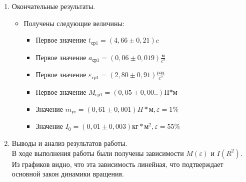 \documentclass[12pt]{article}
\begin{document}
\begin{enumerate}[label=\arabic*)]
        \item Окончательные результаты.
        \begin{itemize} 
            \item Получены следующие величины:
            \begin{itemize}
                \item Первое значение $t_{\text{ср1}} = (4,66 \pm 0,21) c$
                \item Первое значение $a_{\text{ср1}} = (0,06 \pm 0,019) \frac{\text{м}}{c^2}$
                \item Первое значение $\varepsilon_{\text{ср1}} = (2,80 \pm 0,91) \frac{\text{рад}}{c^2}$
                \item Первое значение $M_{\text{ср1}} = (0,05 \pm 0,00..) \text{H*м}$
                \item Значение $m_{\text{ут}} = (0,61 \pm 0,001) H*\text{м}, \varepsilon = 1\%$
                \item Значение $I_0 = (0,01 \pm 0,003) \text{кг}*\text{м}^2, \varepsilon = 55\% $
                
                
        
            \end{itemize}
        
        
        \end{itemize}
        
        
        
        
        \item Выводы и анализ результатов работы.\\
        В ходе выполнения работы были получены зависимости $M(\varepsilon)$ и $I(R^2)$. Из графиков видно, что эта зависимость линейная, что подтверждает основной закон динамики вращения. 
        
        
    \end{enumerate}
    
\end{document}
